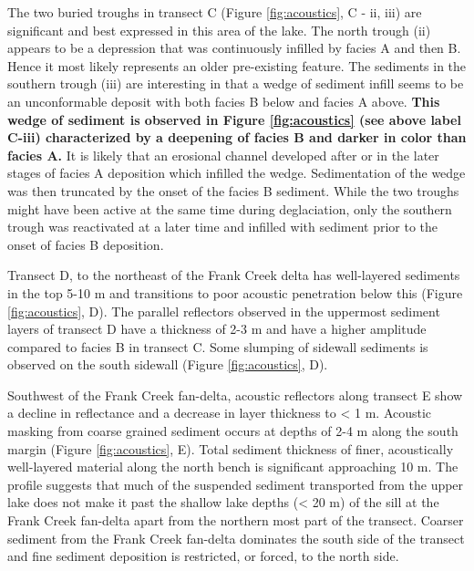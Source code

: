 \documentclass[Royal,times,doublespace,sageh]{sagej}
\begin{document}
The two buried troughs in transect C (Figure \ref{fig:acoustics}, C -
ii, iii) are significant and best expressed in this area of the lake.
The north trough (ii) appears to be a depression that was continuously
infilled by facies A and then B. Hence it most likely represents an
older pre-existing feature. The sediments in the southern trough (iii)
are interesting in that a wedge of sediment infill seems to be an
unconformable deposit with both facies B below and facies A above.
\textbf{This wedge of sediment is observed in Figure \ref{fig:acoustics}
(see above label C-iii) characterized by a deepening of facies B and
darker in color than facies A.} It is likely that an erosional channel
developed after or in the later stages of facies A deposition which
infilled the wedge. Sedimentation of the wedge was then truncated by the
onset of the facies B sediment. While the two troughs might have been
active at the same time during deglaciation, only the southern trough
was reactivated at a later time and infilled with sediment prior to the
onset of facies B deposition.

Transect D, to the northeast of the Frank Creek delta has well-layered
sediments in the top 5-10 m and transitions to poor acoustic penetration
below this (Figure \ref{fig:acoustics}, D). The parallel reflectors
observed in the uppermost sediment layers of transect D have a thickness
of 2-3 m and have a higher amplitude compared to facies B in transect C.
Some slumping of sidewall sediments is observed on the south sidewall
(Figure \ref{fig:acoustics}, D).

Southwest of the Frank Creek fan-delta, acoustic reflectors along
transect E show a decline in reflectance and a decrease in layer
thickness to \textless{} 1 m. Acoustic masking from coarse grained
sediment occurs at depths of 2-4 m along the south margin (Figure
\ref{fig:acoustics}, E). Total sediment thickness of finer, acoustically
well-layered material along the north bench is significant approaching
10 m. The profile suggests that much of the suspended sediment
transported from the upper lake does not make it past the shallow lake
depths (\textless{} 20 m) of the sill at the Frank Creek fan-delta apart
from the northern most part of the transect. Coarser sediment from the
Frank Creek fan-delta dominates the south side of the transect and fine
sediment deposition is restricted, or forced, to the north side.
\end{document}
